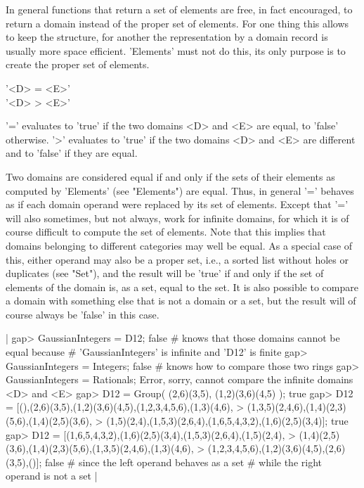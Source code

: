 In  general functions that  return  a set of   elements are free, in fact
encouraged, to return a  domain instead  of the  proper set of  elements.
For  one  thing this  allows  to  keep the    structure, for  another the
representation   by a  domain record is    usually more space  efficient.
'Elements' must not do this, its only purpose is to create the proper set
of elements.


'<D> = <E>' \\
'<D> \<> <E>'

'=' evaluates  to  'true' if the  two  domains <D> and  <E> are equal, to
'false' otherwise.  '\<>' evaluates  to 'true' if the two domains <D> and
<E> are different and to 'false' if they are equal.

Two  domains  are considered  equal  if  and  only if  the  sets of their
elements as computed by 'Elements' (see "Elements") are equal.   Thus, in
general '=' behaves as if each domain operand were replaced by its set of
elements.  Except  that '=' will also sometimes, but not always, work for
infinite domains, for which  it is of course difficult to compute the set
of elements.  Note that this implies that domains belonging  to different
categories may well be equal.  As  a special case of this, either operand
may also be a proper set, i.e., a sorted list without holes or duplicates
(see  "Set"),  and the result will be 'true' if and only  if  the  set of
elements of  the domain  is, as  a set, equal  to  the set.  It  is  also
possible to compare a domain with something else that is not a domain  or
a set, but the result will of course always be 'false' in this case.

|    gap> GaussianIntegers = D12;
    false    # {\GAP} knows that those domains cannot be equal because
             # 'GaussianIntegers' is infinite and 'D12' is finite
    gap> GaussianIntegers = Integers;
    false    # {\GAP} knows how to compare those two rings
    gap> GaussianIntegers = Rationals;
    Error, sorry, cannot compare the infinite domains <D> and <E>
    gap> D12 = Group( (2,6)(3,5), (1,2)(3,6)(4,5) );
    true
    gap> D12 = [(),(2,6)(3,5),(1,2)(3,6)(4,5),(1,2,3,4,5,6),(1,3)(4,6),
    >           (1,3,5)(2,4,6),(1,4)(2,3)(5,6),(1,4)(2,5)(3,6),
    >           (1,5)(2,4),(1,5,3)(2,6,4),(1,6,5,4,3,2),(1,6)(2,5)(3,4)];
    true
    gap> D12 = [(1,6,5,4,3,2),(1,6)(2,5)(3,4),(1,5,3)(2,6,4),(1,5)(2,4),
    >           (1,4)(2,5)(3,6),(1,4)(2,3)(5,6),(1,3,5)(2,4,6),(1,3)(4,6),
    >           (1,2,3,4,5,6),(1,2)(3,6)(4,5),(2,6)(3,5),()];
    false    # since the left operand behaves as a set
             # while the right operand is not a set |

